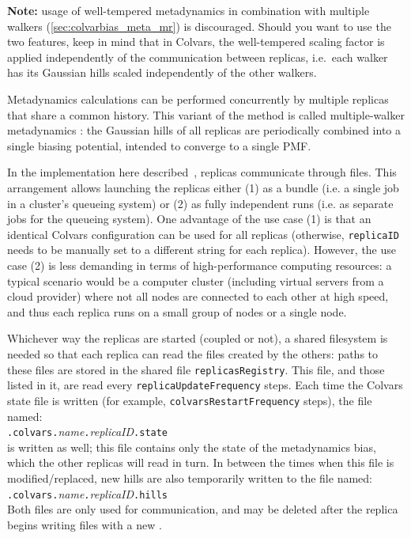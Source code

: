 \textbf{Note:} usage of well-tempered metadynamics in combination with multiple walkers (\ref{sec:colvarbias_meta_mr}) is discouraged.  Should you want to use the two features, keep in mind that in Colvars, the well-tempered scaling factor is applied independently of the communication between replicas, i.e.\ each walker has its Gaussian hills scaled independently of the other walkers.


Metadynamics calculations can be performed concurrently by multiple replicas that share a common history.
This variant of the method is called multiple-walker metadynamics \cite{Raiteri2006}: the Gaussian hills of all replicas are periodically combined into a single biasing potential, intended to converge to a single PMF.

In the implementation here described~\cite{Fiorin2013}, replicas communicate through files.
This arrangement allows launching the replicas either (1) as a bundle (i.e.{} a single job in a cluster's queueing system) or (2) as fully independent runs (i.e.{} as separate jobs for the queueing system).
One advantage of the use case (1) is that an identical Colvars configuration can be used for all replicas (otherwise, \texttt{replicaID} needs to be manually set to a different string for each replica).
However, the use case (2) is less demanding in terms of high-performance computing resources: a typical scenario would be a computer cluster (including virtual servers from a cloud provider) where not all nodes are connected to each other at high speed, and thus each replica runs on a small group of nodes or a single node.

Whichever way the replicas are started (coupled or not), a shared filesystem is needed so that each replica can read the files created by the others: paths to these files are stored in the shared file \texttt{replicasRegistry}.
This file, and those listed in it, are read every \texttt{replicaUpdateFrequency} steps.
Each time the Colvars state file is written (for example, \texttt{colvarsRestartFrequency} steps), the file named:\\
\outputName\texttt{.colvars.}\emph{name}\texttt{.}\emph{replicaID}\texttt{.state}\\
is written as well; this file contains only the state of the metadynamics bias, which the other replicas will read in turn.
In between the times when this file is modified/replaced, new hills are also temporarily written to the file named:\\
\outputName\texttt{.colvars.}\emph{name}\texttt{.}\emph{replicaID}\texttt{.hills}\\
Both files are only used for communication, and may be deleted after the replica begins writing files with a new \outputName.\\


